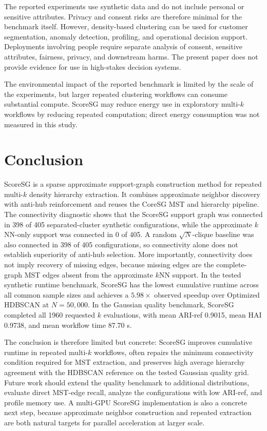 \documentclass[11pt]{article}
\begin{document}
The reported experiments use synthetic data and do not include personal or sensitive attributes. Privacy and consent risks are therefore minimal for the benchmark itself. However, density-based clustering can be used for customer segmentation, anomaly detection, profiling, and operational decision support. Deployments involving people require separate analysis of consent, sensitive attributes, fairness, privacy, and downstream harms. The present paper does not provide evidence for use in high-stakes decision systems.

The environmental impact of the reported benchmark is limited by the scale of the experiments, but larger repeated clustering workflows can consume substantial compute. ScoreSG may reduce energy use in exploratory multi-\(k\) workflows by reducing repeated computation; direct energy consumption was not measured in this study.

\section{Conclusion}

ScoreSG is a sparse approximate support-graph construction method for repeated multi-\(k\) density hierarchy extraction. It combines approximate neighbor discovery with anti-hub reinforcement and reuses the CoreSG MST and hierarchy pipeline. The connectivity diagnostic shows that the ScoreSG support graph was connected in 398 of 405 separated-cluster synthetic configurations, while the approximate \(k\)NN-only support was connected in 0 of 405. A random \(\sqrt{N}\)-clique baseline was also connected in 398 of 405 configurations, so connectivity alone does not establish superiority of anti-hub selection. More importantly, connectivity does not imply recovery of missing edges, because missing edges are the complete-graph MST edges absent from the approximate \(k\)NN support. In the tested synthetic runtime benchmark, ScoreSG has the lowest cumulative runtime across all common sample sizes and achieves a \(5.98\times\) observed speedup over Optimized HDBSCAN at \(N=50{,}000\). In the Gaussian quality benchmark, ScoreSG completed all 1960 requested \(k\) evaluations, with mean ARI-ref 0.9015, mean HAI 0.9738, and mean workflow time 87.70 s.

The conclusion is therefore limited but concrete: ScoreSG improves cumulative runtime in repeated multi-\(k\) workflows, often repairs the minimum connectivity condition required for MST extraction, and preserves high average hierarchy agreement with the HDBSCAN reference on the tested Gaussian quality grid. Future work should extend the quality benchmark to additional distributions, evaluate direct MST-edge recall, analyze the configurations with low ARI-ref, and profile memory use. A multi-GPU ScoreSG implementation is also a concrete next step, because approximate neighbor construction and repeated extraction are both natural targets for parallel acceleration at larger scale.
\end{document}
